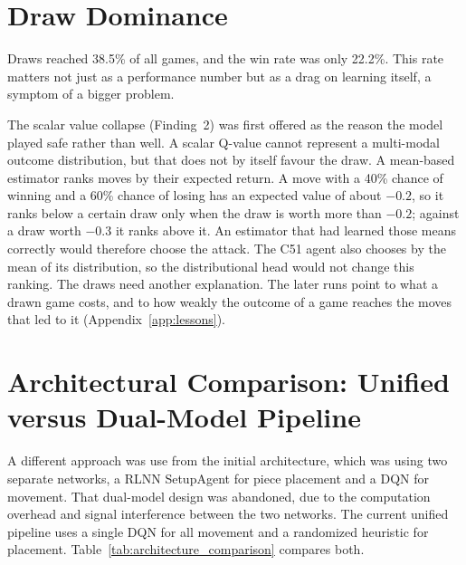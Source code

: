 \section{Draw Dominance}

Draws reached 38.5\% of all games, and the win rate was only 22.2\%. This rate matters not just as a performance number but as a drag on learning itself, a symptom of a bigger problem.

The scalar value collapse (Finding~2) was first offered as the reason the model played safe rather than well. A scalar Q-value cannot represent a multi-modal outcome distribution, but that does not by itself favour the draw. A mean-based estimator ranks moves by their expected return. A move with a 40\% chance of winning and a 60\% chance of losing has an expected value of about $-0.2$, so it ranks below a certain draw only when the draw is worth more than $-0.2$; against a draw worth $-0.3$ it ranks above it. An estimator that had learned those means correctly would therefore choose the attack. The C51 agent also chooses by the mean of its distribution, so the distributional head would not change this ranking. The draws need another explanation. The later runs point to what a drawn game costs, and to how weakly the outcome of a game reaches the moves that led to it (Appendix~\ref{app:lessons}).

\section{Architectural Comparison: Unified versus Dual-Model Pipeline}

A different approach was use from the initial architecture, which was using two separate networks, a RLNN SetupAgent for piece placement and a DQN for movement. That dual-model design was abandoned, due to the computation overhead and signal interference between the two networks. The current unified pipeline uses a single DQN for all movement and a randomized heuristic for placement. Table~\ref{tab:architecture_comparison} compares both.

